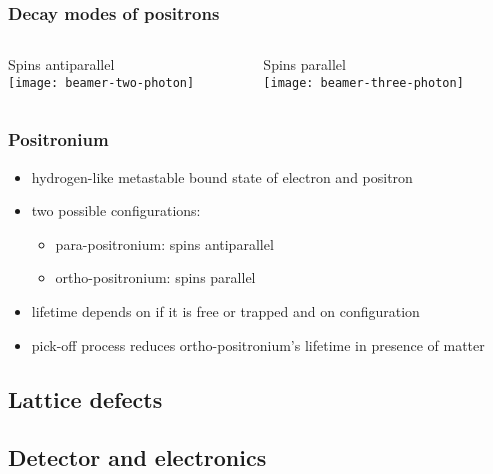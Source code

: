 \documentclass[english, fleqn]{beamer}
\begin{document}
\begin{frame}
    \frametitle{Decay modes of positrons}

    \begin{columns}[T]
        \begin{column}{.5\textwidth}
            Spins antiparallel\\
            \vspace{1cm}
            \centering
            \texttt{[image: beamer-two-photon]}
        \end{column}
        \begin{column}{.5\textwidth}
            Spins parallel\\
            \centering
            \texttt{[image: beamer-three-photon]}
        \end{column}
    \end{columns}
\end{frame}

\begin{frame}
    \frametitle{Positronium}
    \begin{itemize}
        \item
            hydrogen-like metastable bound state of electron and positron
        \item
            two possible configurations:
            \begin{itemize}
                \item
                    para-positronium: spins antiparallel
                \item
                    ortho-positronium: spins parallel
            \end{itemize}
        \item
            lifetime depends on if it is free or trapped and on configuration 
        \item
            pick-off process reduces ortho-positronium's lifetime in presence of matter
    \end{itemize}
\end{frame}

\subsection{Lattice defects}

\begin{frame}
    \frametitle{}
\end{frame}

\subsection{Detector and electronics}
\end{document}
